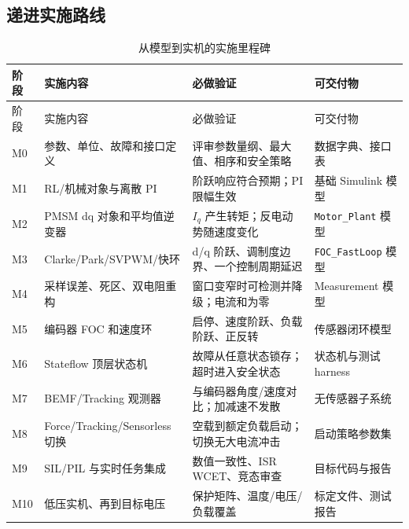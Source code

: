 \documentclass[UTF8,a4paper,11pt,fontset=windows]{ctexart}
\begin{document}
\subsection{递进实施路线}
\begin{longtable}{p{}p{}p{}p{}}
\caption{从模型到实机的实施里程碑}\label{tab:milestone}\\
\toprule 阶段 & 实施内容 & 必做验证 & 可交付物 \\
\midrule
\endfirsthead
\toprule 阶段 & 实施内容 & 必做验证 & 可交付物 \\
\midrule
\endhead
M0 & 参数、单位、故障和接口定义 & 评审参数量纲、最大值、相序和安全策略 & 数据字典、接口表 \\
M1 & RL/机械对象与离散 PI & 阶跃响应符合预期；PI 限幅生效 & 基础 Simulink 模型 \\
M2 & PMSM dq 对象和平均值逆变器 & $I_q$ 产生转矩；反电动势随速度变化 & \texttt{Motor\_Plant} 模型 \\
M3 & Clarke/Park/SVPWM/快环 & d/q 阶跃、调制度边界、一个控制周期延迟 & \texttt{FOC\_FastLoop} 模型 \\
M4 & 采样误差、死区、双电阻重构 & 窗口变窄时可检测并降级；电流和为零 & Measurement 模型 \\
M5 & 编码器 FOC 和速度环 & 启停、速度阶跃、负载阶跃、正反转 & 传感器闭环模型 \\
M6 & Stateflow 顶层状态机 & 故障从任意状态锁存；超时进入安全状态 & 状态机与测试 harness \\
M7 & BEMF/Tracking 观测器 & 与编码器角度/速度对比；加减速不发散 & 无传感器子系统 \\
M8 & Force/Tracking/Sensorless 切换 & 空载到额定负载启动；切换无大电流冲击 & 启动策略参数集 \\
M9 & SIL/PIL 与实时任务集成 & 数值一致性、ISR WCET、竞态审查 & 目标代码与报告 \\
M10 & 低压实机、再到目标电压 & 保护矩阵、温度/电压/负载覆盖 & 标定文件、测试报告 \\
\bottomrule
\end{longtable}
\end{document}
